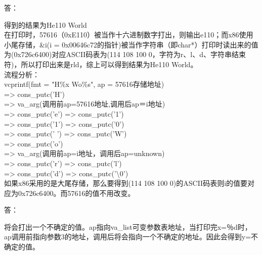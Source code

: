 \documentclass{article}
\begin{document}
\begin{Large}答：\end{Large}
得到的结果为He110 World\\
在打印时，57616（0xE110）被当作十六进制数字打出，则输出e110；而x86使用小尾存储，\&i(i = 0x00646c72的指针)被当作字符串（即char*）打印时读出来的值为(0x726c6400)对应ASCII码表为(114 108 100 0，字符为r、l、d、字符串结束符)，所以打印出来是rld，综上可以得到结果为He110 World。\\
流程分析：\\
vcprintf(fmt = "H\%x Wo\%s", ap = 57616存储地址)\\
=> cons\_putc('H')\\
=> va\_arg(调用前ap=57616地址,调用后ap＝i地址)\\
=> cons\_putc('e') => cons\_putc('1')\\
=> cons\_putc('1') => cons\_putc('0')\\
=> cons\_putc(' ') => cons\_putc('W')\\
=> cons\_putc('o')\\
=> va\_arg(调用前ap=i地址，调用后ap=unknown)\\
=> cons\_putc('r') => cons\_putc('l')\\
=> cons\_putc('d') => cons\_putc('\textbackslash0')\\
如果x86采用的是大尾存储，那么要得到(114 108 100 0)的ASCII码表则i的值要对应为0x726c6400。而57616的值不用改变。\\


\begin{Large}答：\end{Large}
将会打出一个不确定的值。ap指向va\_list可变参数表地址，当打印完x=％d时，ap调用前指向参数3的地址，调用后将会指向一个不确定的地址。因此会得到y=不确定的值。
\\
\end{document}

